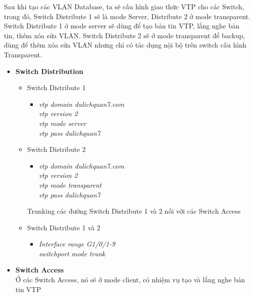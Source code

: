\documentclass[a4paper, 12pt]{article}
\begin{document}
\hspace*{1cm}Sau khi tạo các VLAN Database, ta sẽ cấu hình giao thức VTP cho các Switch, trong đó, Switch Distribute 1 sẽ là mode Server, Distribute 2 ở mode transparent. Switch Distribute 1 ở mode server sẽ dùng để tạo bản tin VTP, lắng nghe bản tin, thêm  xóa sửa VLAN. Switch Distribute 2 sẽ ở mode transparent để backup, dùng để thêm xóa sửa VLAN nhưng chỉ có tác dụng nội bộ trên switch cấu hình Transparent.
\renewcommand{\labelitemi}{$\blacksquare$}
\renewcommand\labelitemii{$\nabla$}
\renewcommand\labelitemiii{$\square$}
\begin{itemize}
  \item \textbf{Switch Distribution}
    \begin{itemize}
    \item Switch Distribute 1
    \begin{itemize}
      \item \textit{vtp domain dulichquan7.com\\
            vtp version 2\\
            vtp mode server\\
            vtp pass dulichquan7}
    \end{itemize}
    \item Switch Distribute 2
     \begin{itemize}
      \item \textit{vtp domain dulichquan7.com\\
                    vtp version 2\\
                    vtp mode transparent \\
                    vtp pass dulichquan7}  
    \end{itemize}
    \hspace*{0.25cm} Trunking các đường  Switch Distribute 1 và 2 nối với các Switch Access 
     \item Switch Distribute 1 và 2
     \begin{itemize}
      \item \textit{Interface range G1/0/1-9\\
                    switchport mode trunk}   
    \end{itemize}
   \end{itemize}
  \item \textbf{Switch Access}\\
\hspace*{1cm} Ở các Switch Access, nó sẽ ở mode client, có nhiệm vụ tạo và lắng nghe bản tin VTP\\

\end{itemize}
\end{document}
